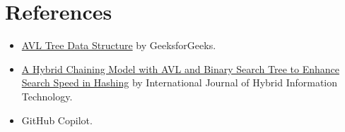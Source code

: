 \section{References}
\begin{itemize}
	\item \href{https://www.geeksforgeeks.org/introduction-to-avl-tree/}{AVL Tree Data Structure} by GeeksforGeeks.
	\item \href{https://gvpress.com/journals/IJHIT/vol8_no3/18.pdf} {A Hybrid Chaining Model with AVL and Binary Search Tree to Enhance Search Speed in Hashing} by International Journal of Hybrid Information Technology.
	\item GitHub Copilot.
\end{itemize}
